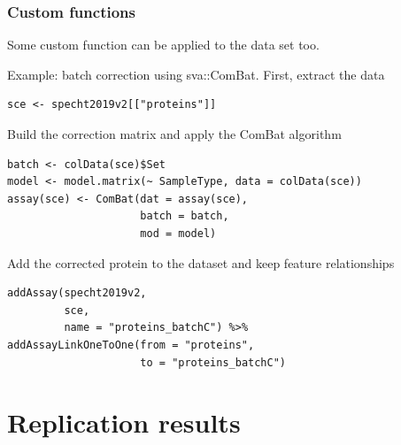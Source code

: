 \documentclass{beamer}
\newcommand{\hcode}[2][lgray]{{\ttfamily\color{vdgray}\colorbox{#1}{#2}}}
\newcommand{\frametitlesection}[1]{\frametitle{\centering #1 \footnotesize \hspace{0pt plus 1 filll} \insertsection}}
\begin{document}
\begin{frame}[fragile]
    \frametitlesection{Custom functions}

    Some custom function can be applied to the data set too.

    Example: batch correction using \hcode{sva::ComBat}. First, extract the data

    \begin{lstlisting}[basicstyle = \scriptsize\ttfamily\color{vdgray}]
sce <- specht2019v2[["proteins"]]
    \end{lstlisting}

    Build the correction matrix and apply the ComBat algorithm

    \begin{lstlisting}[basicstyle = \scriptsize\ttfamily\color{vdgray}]
batch <- colData(sce)$Set
model <- model.matrix(~ SampleType, data = colData(sce))
assay(sce) <- ComBat(dat = assay(sce),
                     batch = batch,
                     mod = model)
    \end{lstlisting}

    Add the corrected protein to the dataset and keep feature relationships

    \begin{lstlisting}[basicstyle = \scriptsize\ttfamily\color{vdgray}]
addAssay(specht2019v2,
         sce,
         name = "proteins_batchC") %>%
addAssayLinkOneToOne(from = "proteins",
                     to = "proteins_batchC")
    \end{lstlisting}


\end{frame}


\section{Replication results}
\end{document}
